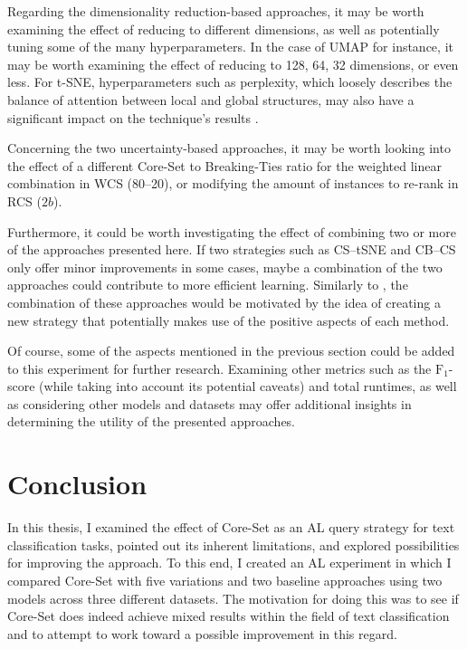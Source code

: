 \documentclass[english,bachelor,ul]{webisthesis} %
\begin{document}
Regarding the dimensionality reduction-based approaches, it may be worth examining the effect of reducing to different dimensions, as well as potentially tuning some of the many hyperparameters. In the case of UMAP for instance, it may be worth examining the effect of reducing to 128, 64, 32 dimensions, or even less. For t-SNE, hyperparameters such as perplexity, which loosely describes the balance of attention between local and global structures, may also have a significant impact on the technique's results \citep{wattenberg2016how}. 

Concerning the two uncertainty-based approaches, it may be worth looking into the effect of a different Core-Set to Breaking-Ties ratio for the weighted linear combination in WCS (80--20), or modifying the amount of instances to re-rank in RCS ($2b$). 

Furthermore, it could be worth investigating the effect of combining two or more of the approaches presented here. If two strategies such as CS--tSNE and CB--CS only offer minor improvements in some cases, maybe a combination of the two approaches could contribute to more efficient learning. Similarly to \cite{DBLP:journals/corr/abs-2110-03785}, the combination of these approaches would be motivated by the idea of creating a new strategy that potentially makes use of the positive aspects of each method. 

Of course, some of the aspects mentioned in the previous section could be added to this experiment for further research. Examining other metrics such as the $\text{F}_1$-score (while taking into account its potential caveats) and total runtimes, as well as considering other models and datasets may offer additional insights in determining the utility of the presented approaches. 

\chapter{Conclusion}

In this thesis, I examined the effect of Core-Set as an AL query strategy for text classification tasks, pointed out its inherent limitations, and explored possibilities for improving the approach. To this end, I created an AL experiment in which I compared Core-Set with five variations and two baseline approaches using two models across three different datasets. The motivation for doing this was to see if Core-Set does indeed achieve mixed results within the field of text classification and to attempt to work toward a possible improvement in this regard. 
\end{document}
